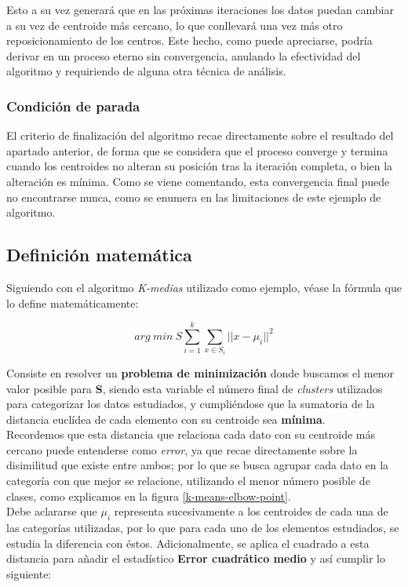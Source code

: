 \documentclass[]{report}
\begin{document}
					Esto a su vez generará que en las próximas iteraciones los datos puedan cambiar a su vez de centroide más cercano, lo que conllevará una vez más otro reposicionamiento de los centros. Este hecho, como puede apreciarse, podría derivar en un proceso eterno sin convergencia, anulando la efectividad del algoritmo y requiriendo de alguna otra técnica de análisis.
				
				\subsubsection{Condición de parada}
				
					El criterio de finalización del algoritmo recae directamente sobre el resultado del apartado anterior, de forma que se considera que el proceso converge y termina cuando los centroides no alteran su posición tras la iteración completa, o bien la alteración es mínima. Como se viene comentando, esta convergencia final puede no encontrarse nunca, como se enumera en las limitaciones de este ejemplo de algoritmo.
					
			\subsection{Definición matemática}
			
				Siguiendo con el algoritmo \textit{K-medias} utilizado como ejemplo, véase la fórmula que lo define matemáticamente:
			
				$$arg\:min\:S\sum_{i=1}^k\sum_{x\in{S_i}} \vert\vert{x-\mu_i}\vert\vert^2$$
				
				Consiste en resolver un \textbf{problema de minimización} donde buscamos el menor valor posible para \textbf{S}, siendo esta variable el número final de \textit{clusters} utilizados para categorizar los datos estudiados, y cumpliéndose que la sumatoria de la distancia euclídea de cada elemento con su centroide sea \textbf{mínima}.\\
				
				Recordemos que esta distancia que relaciona cada dato con su centroide más cercano puede entenderse como \textit{error}, ya que recae directamente sobre la disimilitud que existe entre ambos; por lo que se busca agrupar cada dato en la categoría con que mejor se relacione, utilizando el menor número posible de clases, como explicamos en la figura \ref{k-means-elbow-point}.\\
				
				Debe aclararse que $\mu_i$ representa sucesivamente a los centroides de cada una de las categorías utilizadas, por lo que para cada uno de los elementos estudiados, se estudia la diferencia con éstos. Adicionalmente, se aplica el cuadrado a esta distancia para añadir el estadístico \textbf{Error cuadrático medio} \cite{mean-squared-error} y así cumplir lo siguiente:
				
\end{document}
